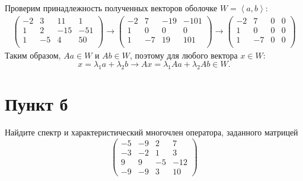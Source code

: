 \documentclass[12pt]{article}
\begin{document}
    Проверим принадлежность полученных векторов оболочке $W = \left < a, b \right >$:
    \begin{gather*}
        \begin{pmatrix}
            -2 & 3  & 11  & 1   \\
            1  & 2  & -15 & -51 \\
            1  & -5 & 4   & 50  \\
        \end{pmatrix}
        \rightarrow
        \begin{pmatrix}
            -2 & 7  & -19 & -101 \\
            1  & 0  & 0   & 0    \\
            1  & -7 & 19  & 101  \\
        \end{pmatrix}
        \rightarrow
        \begin{pmatrix}
            -2 & 7  & 0 & 0 \\
            1  & 0  & 0 & 0 \\
            1  & -7 & 0 & 0 \\
        \end{pmatrix}
    \end{gather*}
    Таким образом, $Aa \in W$ и $Ab \in W$, поэтому для любого вектора $x \in W$:
    \[
        x = \lambda_1 a + \lambda_2 b
        \rightarrow
        A x = \lambda_1 Aa + \lambda_2 Ab \in W.
    \]

    \section*{Пункт б}
    Найдите спектр и характеристический многочлен оператора, заданного матрицей
    \[
        \begin{pmatrix}
            -5 & -9 & 2  & 7   \\
            -3 & -2 & 1  & 3   \\
            9  & 9  & -5 & -12 \\
            -9 & -9 & 3  & 10
        \end{pmatrix}
    \]
\end{document}
